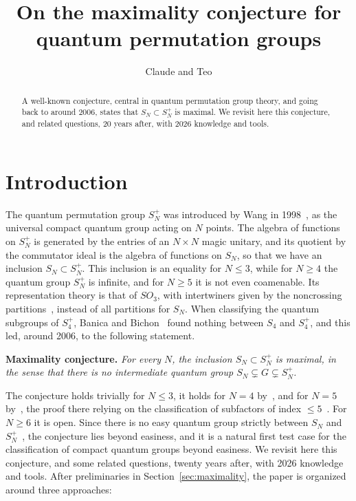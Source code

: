 \documentclass[11pt]{amsart}
\theoremstyle{definition}
\theoremstyle{remark}
\theoremstyle{plain}
\numberwithin{equation}{section}
\numberwithin{table}{section}
\begin{document}
\title[Maximality conjecture]{On the maximality conjecture for quantum permutation groups}
\author{Claude and Teo}


\begin{abstract}
A well-known conjecture, central in quantum permutation group theory, and going back to around 2006, states that $S_N\subset S_N^+$ is maximal. We revisit here this conjecture, and related questions, 20 years after, with 2026 knowledge and tools.
\end{abstract}

\maketitle

\tableofcontents

\section*{Introduction}

The quantum permutation group $S_N^+$ was introduced by Wang in 1998~\cite{wa}, as the universal compact quantum group acting on $N$ points. The algebra of functions on $S_N^+$ is generated by the entries of an $N\times N$ magic unitary, and its quotient by the commutator ideal is the algebra of functions on $S_N$, so that we have an inclusion $S_N\subset S_N^+$. This inclusion is an equality for $N\le3$, while for $N\ge4$ the quantum group $S_N^+$ is infinite, and for $N\ge5$ it is not even coamenable. Its representation theory is that of $SO_3$, with intertwiners given by the noncrossing partitions~\cite{ba}, instead of all partitions for $S_N$. When classifying the quantum subgroups of $S_4^+$, Banica and Bichon~\cite{bb} found nothing between $S_4$ and $S_4^+$, and this led, around 2006, to the following statement.

\smallskip
\noindent\textbf{Maximality conjecture.} \emph{For every $N$, the inclusion $S_N\subset S_N^+$ is maximal, in the sense that there is no intermediate quantum group $S_N\subsetneq G\subsetneq S_N^+$.}

\smallskip
The conjecture holds trivially for $N\le3$, it holds for $N=4$ by~\cite{bb}, and for $N=5$ by~\cite{bah}, the proof there relying on the classification of subfactors of index $\le5$~\cite{imps,jms}. For $N\ge6$ it is open. Since there is no easy quantum group strictly between $S_N$ and $S_N^+$~\cite{bcs}, the conjecture lies beyond easiness, and it is a natural first test case for the classification of compact quantum groups beyond easiness. We revisit here this conjecture, and some related questions, twenty years after, with 2026 knowledge and tools. After preliminaries in Section~\ref{sec:maximality}, the paper is organized around three approaches:
\end{document}
